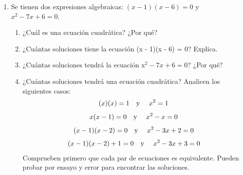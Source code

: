 \documentclass[11pt]{book}
\begin{document}
\begin{enumerate}
    \item Se tienen dos expresiones algebraicas: $(x - 1)(x - 6) = 0$ y $x^2 - 7x + 6 = 0$.

          \begin{enumerate}
              \item ¿Cuál es una ecuación cuadrática? ¿Por qué?
              \item ¿Cuántas soluciones tiene la ecuación (x - 1)(x - 6) = 0? Explica.
              \item ¿Cuántas soluciones tendrá la ecuación x$^2 - 7x + 6 = 0$? ¿Por qué?
              \item ¿Cuántas soluciones tendrá una ecuación cuadrática?
                    Analicen los siguientes casos:
                    \[(x)(x) = 1 \text{\quad y \quad} x^2 = 1\]
                    \[x(x - 1) = 0 \text{\quad y \quad}x^2 - x = 0\]
                    \[(x - 1)(x - 2) = 0 \text{\quad y \quad} x^2 - 3x + 2 = 0\]
                    \[(x - 1)(x - 2) + 1 = 0 \text{\quad y \quad} x^2 - 3x + 3 = 0\]
                    Comprueben primero que cada par de ecuaciones es equivalente. Pueden probar por ensayo y error para
                    encontrar las soluciones.\\
          \end{enumerate}
\end{enumerate}
\end{document}

